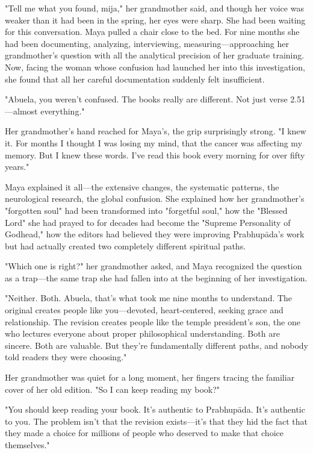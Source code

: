 \documentclass[12pt,twoside]{book}
\begin{document}
"Tell me what you found, mija," her grandmother said, and though her voice was weaker than it had been in the spring, her eyes were sharp. She had been waiting for this conversation.
Maya pulled a chair close to the bed. For nine months she had been documenting, analyzing, interviewing, measuring—approaching her grandmother's question with all the analytical precision of her graduate training. Now, facing the woman whose confusion had launched her into this investigation, she found that all her careful documentation suddenly felt insufficient.

"Abuela, you weren't confused. The books really are different. Not just verse 2.51—almost everything."

Her grandmother's hand reached for Maya's, the grip surprisingly strong. "I knew it. For months I thought I was losing my mind, that the cancer was affecting my memory. But I knew these words. I've read this book every morning for over fifty years."

Maya explained it all—the extensive changes, the systematic patterns, the neurological research, the global confusion. She explained how her grandmother's "forgotten soul" had been transformed into "forgetful soul," how the "Blessed Lord" she had prayed to for decades had become the "Supreme Personality of Godhead," how the editors had believed they were improving Prabhupāda's work but had actually created two completely different spiritual paths.

"Which one is right?" her grandmother asked, and Maya recognized the question as a trap—the same trap she had fallen into at the beginning of her investigation.

"Neither. Both. Abuela, that's what took me nine months to understand. The original creates people like you—devoted, heart-centered, seeking grace and relationship. The revision creates people like the temple president's son, the one who lectures everyone about proper philosophical understanding. Both are sincere. Both are valuable. But they're fundamentally different paths, and nobody told readers they were choosing."

Her grandmother was quiet for a long moment, her fingers tracing the familiar cover of her old edition. "So I can keep reading my book?"

"You should keep reading your book. It's authentic to Prabhupāda. It's authentic to you. The problem isn't that the revision exists—it's that they hid the fact that they made a choice for millions of people who deserved to make that choice themselves."
\end{document}
